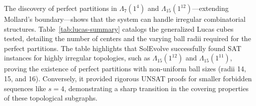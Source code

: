 \begin{table}[t]
\centering
\caption{SAT-based self-orthogonal embeddings across $\mathbb{F}_2,\mathbb{F}_3,\mathbb{F}_4,\mathbb{F}_5$}
\label{tab:so-results}
\end{table}

The discovery of perfect partitions in $\Lambda_7(1^4)$ and $\Lambda_{15}(1^{12})$---extending Mollard's boundary---shows that the system can handle irregular combinatorial structures. Table~\ref{tab:lucas-summary} catalogs the generalized Lucas cubes tested, detailing the number of centers and the varying ball radii required for the perfect partitions. The table highlights that SolEvolve successfully found SAT instances for highly irregular topologies, such as $\Lambda_{15}(1^{12})$ and $\Lambda_{15}(1^{11})$, proving the existence of perfect partitions with non-uniform ball sizes (radii 14, 15, and 16). Conversely, it provided rigorous UNSAT proofs for smaller forbidden sequences like $s=4$, demonstrating a sharp transition in the covering properties of these topological subgraphs.

